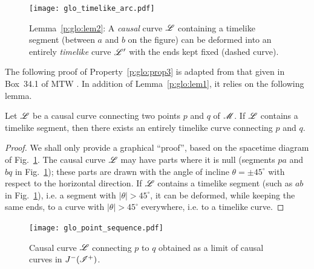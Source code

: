 \begin{figure}
\centerline{\texttt{[image: glo\_timelike\_arc.pdf]}}
\caption[]{\label{f:glo:timelike_arc} \footnotesize
Lemma~\ref{p:glo:lem2}: A \emph{causal} curve $\mathscr{L}$ containing a timelike segment (between
$a$ and $b$ on the figure) can be deformed into an entirely \emph{timelike} curve $\mathscr{L}'$
with the ends kept fixed (dashed curve).}
\end{figure}

The following proof of Property~\ref{p:glo:prop3}
is adapted from that given in Box~34.1 of MTW \cite{MisneTW73}.
In addition of Lemma~\ref{p:glo:lem1}, it relies on the following lemma.

\begin{lemma}
\label{p:glo:lem2}
Let $\mathscr{L}$ be a causal curve connecting two points $p$ and $q$
of $\mathscr{M}$. If $\mathscr{L}$ contains a timelike segment, then there exists an
entirely timelike curve connecting $p$ and $q$.
\end{lemma}
\begin{proof}
We shall only provide a graphical ``proof'', based on the spacetime diagram
of Fig.~\ref{f:glo:timelike_arc}. The causal curve $\mathscr{L}$ may have parts where it is null (segments $pa$ and $bq$ in Fig.~\ref{f:glo:timelike_arc}); these parts are drawn with
the angle of incline $\theta = \pm 45^\circ$ with respect to the horizontal direction.
If $\mathscr{L}$ contains a timelike segment (such as $ab$ in Fig.~\ref{f:glo:timelike_arc}), i.e. a segment with $|\theta|>45^\circ$,
it can be deformed, while keeping the same ends, to a curve with $|\theta|>45^\circ$
everywhere, i.e. to a timelike curve.
\end{proof}

\begin{figure}
\centerline{\texttt{[image: glo\_point\_sequence.pdf]}}
\caption[]{\label{f:glo:point_sequence} \footnotesize
Causal curve $\mathscr{L}$ connecting $p$ to $q$ obtained as a limit of causal curves
in $J^-(\mathscr{I}^+)$.}
\end{figure}

